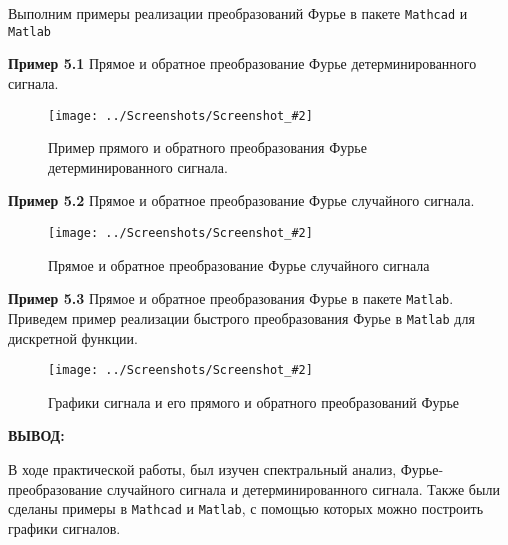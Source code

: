\documentclass[14pt,a4paper]{extreport}
\newcommand{\sshot}[2]{\begin{figure}[ht]%
\centering\texttt{[image: ../Screenshots/Screenshot\_\#2]}%
\caption{#1}%
\label{sshot#2}%
\end{figure}%
}
\newcommand{\header}[1]{%
{
\clearpage%
\fontsize{16pt}{14pt}\selectfont
\begin{center}
\textbf{\MakeUppercase{#1}:}
\end{center}
}
}
\newcommand{\mathcad}{\texttt{Mathcad}}
\newcommand{\matlab}{\texttt{Matlab}}
\begin{document}
Выполним примеры реализации преобразований Фурье в пакете \mathcad{} и \matlab{}

\vspace{50pt}

\textbf{Пример 5.1 } Прямое и обратное преобразование Фурье детерминированного сигнала.

\sshot{Пример прямого и обратного преобразования Фурье детерминированного сигнала.}{1}

\clearpage

\textbf{Пример 5.2 } Прямое и обратное преобразование Фурье случайного сигнала.

\sshot{Прямое и обратное преобразование Фурье случайного сигнала}{2}

\clearpage

\textbf{Пример 5.3 } Прямое и обратное преобразования Фурье в пакете \matlab {}. Приведем пример реализации быстрого преобразования Фурье в \matlab{} для дискретной функции.

\sshot{Графики сигнала и его прямого и обратного преобразований Фурье}{3}

\header{Вывод}


В ходе практической работы, был изучен спектральный анализ, Фурье-преобразование случайного сигнала и детерминированного сигнала. Также были сделаны примеры в \mathcad{} и \matlab{}, с помощью которых можно построить графики сигналов.
\end{document}
